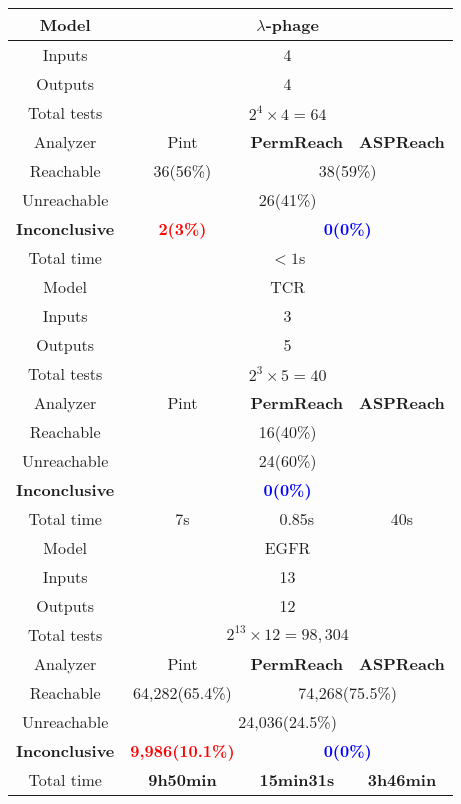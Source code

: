 \begin{table}[ht]
    \begin{tabular}{|c|c|c|c|}
    \hline
     Model    &  \multicolumn{3}{c|}{$\lambda$-phage}\\
     \hline
     Inputs    & \multicolumn{3}{c|}{4}\\
     \hline
     Outputs&\multicolumn{3}{c|}{4}\\
     \hline
     Total tests&\multicolumn{3}{c|}{$2^4\times 4=64$}\\
     \hline
     Analyzer  &  Pint  &  \textbf{PermReach}   &\textbf{ASPReach}\\
     \hline
     Reachable & 36(56\%)& \multicolumn{2}{c|}{38(59\%)} \\
     \hline
     Unreachable&\multicolumn{3}{c|}{26(41\%)}\\
     \hline
     \textbf{Inconclusive} &\textcolor{red}{\textbf{2(3\%)}}&\multicolumn{2}{c|}{\textcolor{blue}{\textbf{0(0\%)}}}\\
     \hline
     Total time & \multicolumn{3}{c|}{$<1$s}\\
    \hline
     Model    &  \multicolumn{3}{c|}{TCR}\\
     \hline
     Inputs    & \multicolumn{3}{c|}{3}\\
     \hline
     Outputs&\multicolumn{3}{c|}{5}\\
     \hline
     Total tests&\multicolumn{3}{c|}{$2^3\times 5=40$}\\
     \hline
     Analyzer  &  Pint  &  \textbf{PermReach}   &\textbf{ASPReach}\\
     \hline
     Reachable & \multicolumn{3}{c|}{16(40\%)} \\
     \hline
     Unreachable&\multicolumn{3}{c|}{24(60\%)} \\
     \hline
     \textbf{Inconclusive} &\multicolumn{3}{c|}{\textcolor{blue}{\textbf{0(0\%)}}} \\
     \hline
     Total time &  7s     &0.85s  &  40s        \\
    \hline
     Model    &  \multicolumn{3}{c|}{EGFR}\\
     \hline
     Inputs    & \multicolumn{3}{c|}{13}\\
     \hline
     Outputs&\multicolumn{3}{c|}{12}\\
     \hline
     Total tests&\multicolumn{3}{c|}{$2^{13}\times 12=98,304$}\\
     \hline
     Analyzer  &  Pint  &  \textbf{PermReach}   &\textbf{ASPReach}\\
     \hline
     Reachable & 64,282(65.4\%)  & \multicolumn{2}{c|}{74,268(75.5\%)} \\
     \hline
     Unreachable&\multicolumn{3}{c|}{24,036(24.5\%)}\\
     \hline
     \textbf{Inconclusive} &\textcolor{red}{\textbf{9,986(10.1\%)}}&\multicolumn{2}{c|}{\textcolor{blue}{\textbf{0(0\%)}}}   \\
     \hline
     Total time & \textbf{9h50min}      & \textbf{15min31s}         & \textbf{3h46min} \\
     \hline
    \end{tabular}
    

\end{table}
